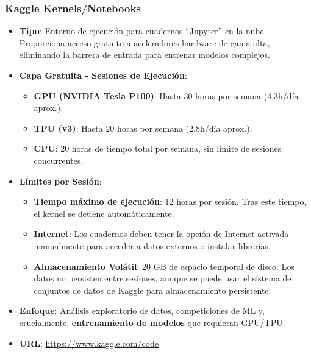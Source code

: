 \subsubsection*{Kaggle Kernels/Notebooks}
\begin{itemize}
	\item \textbf{Tipo}: Entorno de ejecución para cuadernos ``Jupyter'' en la nube. Proporciona acceso gratuito a aceleradores hardware de gama alta, eliminando la barrera de entrada para entrenar modelos complejos.
	\item \textbf{Capa Gratuita - Sesiones de Ejecución}:
	\begin{itemize}
		\item \textbf{GPU (NVIDIA Tesla P100)}: Hasta 30 horas por semana (4.3h/día aprox.).
		\item \textbf{TPU (v3)}: Hasta 20 horas por semana (2.8h/día aprox.).
		\item \textbf{CPU}: 20 horas de tiempo total por semana, sin límite de sesiones concurrentes.
	\end{itemize}
	\item \textbf{Límites por Sesión}:
	\begin{itemize}
		\item \textbf{Tiempo máximo de ejecución}: 12 horas por sesión. Tras este tiempo, el kernel se detiene automáticamente.
		\item \textbf{Internet}: Los cuadernos deben tener la opción de Internet activada manualmente para acceder a datos externos o instalar librerías.
		\item \textbf{Almacenamiento Volátil}: 20 GB de espacio temporal de disco. Los datos no persisten entre sesiones, aunque se puede usar el sistema de conjuntos de datos de Kaggle para almacenamiento persistente.
	\end{itemize}
	\item \textbf{Enfoque}: Análisis exploratorio de datos, competiciones de ML y, crucialmente, \textbf{entrenamiento de modelos} que requieran GPU/TPU.
	\item \textbf{URL}: \url{https://www.kaggle.com/code}
\end{itemize}

